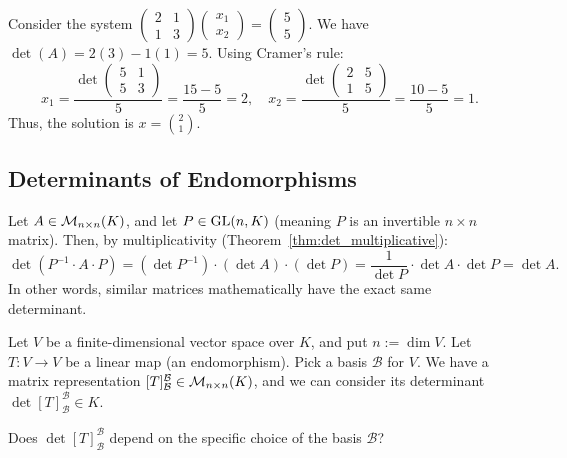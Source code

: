 \begin{example}
  Consider the system $\left(\begin{smallmatrix} 2 & 1 \\ 1 & 3 \end{smallmatrix}\right) \left(\begin{smallmatrix} x_1 \\ x_2 \end{smallmatrix}\right) = \left(\begin{smallmatrix} 5 \\ 5 \end{smallmatrix}\right)$. We have $\det(A) = 2(3) - 1(1) = 5$. Using Cramer's rule:
  \[
  x_1 = \frac{\det \begin{pmatrix} 5 & 1 \\ 5 & 3 \end{pmatrix}}{5} = \frac{15 - 5}{5} = 2, \quad x_2 = \frac{\det \begin{pmatrix} 2 & 5 \\ 1 & 5 \end{pmatrix}}{5} = \frac{10 - 5}{5} = 1.
  \]
  Thus, the solution is $x = \binom{2}{1}$.
\end{example}

\subsection{Determinants of Endomorphisms}

\begin{warmup} Let $A \in \mathcal{M}_{n \times n}(K)$, and let $P \in \operatorname{GL}(n, K)$ (meaning $P$ is an invertible $n \times n$ matrix). Then, by multiplicativity (Theorem~\ref{thm:det_multiplicative}):
  \[
  \det(P^{-1} \cdot A \cdot P) = (\det P^{-1}) \cdot (\det A) \cdot (\det P) = \frac{1}{\det P} \cdot \det A \cdot \det P = \det A.
  \]
  In other words, similar matrices mathematically have the exact same determinant.
\end{warmup}

Let $V$ be a finite-di\-men\-sional vector space over $K$, and put $n := \dim V$. Let $T : V \to V$ be a linear map (an endomorphism). Pick a basis $\mathcal{B}$ for $V$. We have a matrix representation $[T]_{\mathcal{B}}^{\mathcal{B}} \in \mathcal{M}_{n \times n}(K)$, and we can consider its determinant $\det [T]_{\mathcal{B}}^{\mathcal{B}} \in K$.

\begin{question} Does $\det [T]_{\mathcal{B}}^{\mathcal{B}}$ depend on the specific choice of the basis $\mathcal{B}$?
\end{question}

